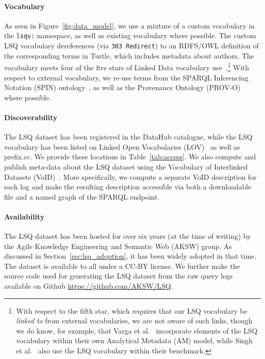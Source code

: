 \paragraph{Vocabulary} As seen in Figure~\ref{fig:data_model}, we use a mixture of a custom vocabulary in the \texttt{lsqv:} namespace, as well as existing vocabulary where possible. The custom LSQ vocabulary dereferences (via \texttt{303 Redirect}) to an RDFS/OWL definition of the corresponding terms in Turtle, which includes metadata about authors. The vocabulary meets four of the five stars of Linked Data vocabulary use~\cite{JanowiczHAKV14}.\footnote{With respect to the fifth star, which requires that our LSQ vocabulary be \textit{linked to} from external vocabularies, we are not aware of such links, though we do know, for example, that Varga et al.~\cite{varga2018analytical} incorporate elements of the LSQ vocabulary within their own Analytical Metadata (AM) model, while Singh et al.~\cite{singh2019qaldgen} also use the LSQ vocabulary within their benchmark.} With respect to external vocabulary, we re-use terms from the SPARQL Inferencing Notation (SPIN) ontology~\cite{spin}, as well as the Provenance Ontology (PROV-O)~\cite{prov-o} where possible.%

\paragraph{Discoverability} The LSQ dataset has been registered in the DataHub catalogue, while the LSQ vocabulary has been listed on Linked Open Vocabularies (LOV)~\cite{VandenbusscheAP17} as well as prefix.cc. We provide these locations in Table~\ref{tab:access}. We also compute and publish meta-data about the LSQ dataset using the Vocabulary of Interlinked Datasets (VoID)~\cite{key:void}. More specifically, we compute a separate VoID description for each log and make the resulting description accessible via both a downloadable file and a named graph of the SPARQL endpoint.

\paragraph{Availability} The LSQ dataset has been hosted for over six years (at the time of writing) by the Agile Knowledge Engineering and Semantic Web (AKSW) group. As discussed in Section~\ref{sec:lsq_adoption}, it has been widely adopted in that time. The dataset is available to all under a CC-BY license. We further make the source code used for generating the LSQ dataset from the raw query logs available on Github \url{https://github.com/AKSW/LSQ}.

